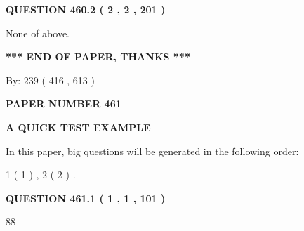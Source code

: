 \documentclass[12pt]{article}
\begin{document}
{\textbf{\Large{QUESTION
460.2 
 ( 2 , 2 , 201 )
}}}
  
  
 
 
\noindent{}
 
 
 None of above.
 
 
 
 
   
   
 \vspace{0.2in}
 
   
   
   
   
\vspace{1.0in} 
{\textbf{\large{ *** END OF PAPER, THANKS *** }}} 
   
   
\hspace{1.0in} By: 
 239 ( 416 ,  613 )
   
   
   
   
\newpage 
\setcounter{page}{ 
   461001 } 
   
   
   
   
 {\textbf{ \Large{ PAPER NUMBER  461  }}}
   
   
\vspace{0.2in}
   
   
   
   
   
   
 \vspace{0.2in}
{\LARGE {\textbf{ A QUICK TEST EXAMPLE}}}
   
   
   
\vspace{0.2in}
   
In this paper, big questions will be generated in the following order: 
   
   
   1 ( 1 )
 ,
   2 ( 2 )
 .
  
\vspace{0.2in}
  
{\textbf{\Large{QUESTION
461.1 
 ( 1 , 1 , 101 )
}}}
  
  
 
 
\noindent{}

88
 
 
 
 
\noindent{}
\end{document}
